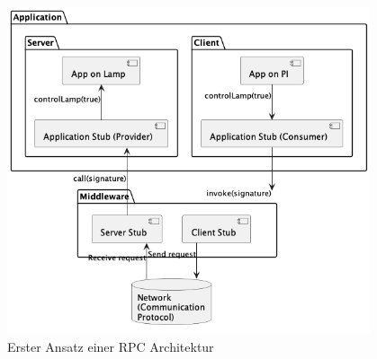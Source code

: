 \documentclass[../vs-script-first-v01.tex]{subfiles}
\begin{document}
\begin{figure}[!ht]
  \centering
  \includegraphics[width=0.95\textwidth]{fig/uml/rpc-simple.png}
  \caption{Erster Ansatz einer RPC Architektur}
  \label{fig:simple-rpc}
\end{figure}
\end{document}
